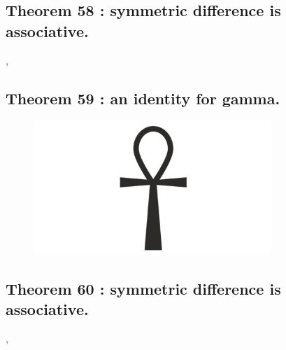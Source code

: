 \documentclass[preview]{standalone}
\begin{document}
\subsection[Symmetric difference is associative.]
    {
        \color{section}Theorem 58 \color{black} : symmetric difference is associative.
    }

\sep
\pagebreak


\subsection[An identity for gamma.]
    {
        \color{section}Theorem 59 \color{black} : an identity for gamma.
    }

\begin{figure}[!h]
    \centering
    \includegraphics[width=9cm]{../resources/jpg/2.2.set.operations/ankh.jpg}
\end{figure}
\pagebreak


\subsection[Symmetric difference is associative.]
    {
        \color{section}Theorem 60 \color{black} : symmetric difference is associative.
    }

\sep
\pagebreak
\end{document}
